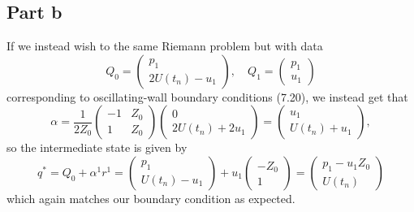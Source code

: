 \documentclass{article}
\begin{document}
\subsection{Part b}
If we instead wish to the same Riemann problem but with data  
\[
Q_0=\begin{pmatrix}
	p_1\\2U(t_n)-u_1
\end{pmatrix},\quad Q_1=\begin{pmatrix}
	p_1\\u_1
\end{pmatrix}
\]
corresponding to oscillating-wall boundary conditions (7.20), we instead get that 
\[
\alpha=\frac{1}{2Z_0}\begin{pmatrix}
	-1 &Z_0\\
	1&Z_0
\end{pmatrix}\begin{pmatrix}
	0\\2U(t_n)+2u_1
\end{pmatrix}=\begin{pmatrix}
	u_1\\U(t_n)+u_1
\end{pmatrix},
\]
so the intermediate state is given by
\[
q^*=Q_0+\alpha^1r^1=\begin{pmatrix}
	p_1\\U(t_n)-u_1
\end{pmatrix}+u_1\begin{pmatrix}
	-Z_0\\1
\end{pmatrix}=\begin{pmatrix}
	p_1-u_1Z_0\\U(t_n)
\end{pmatrix}
\]
which again matches our boundary condition as expected.
\end{document}
